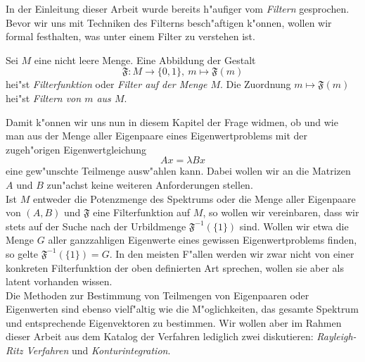 In der Einleitung dieser Arbeit wurde bereits h"aufiger vom \emph{Filtern} gesprochen.
Bevor wir uns mit Techniken des Filterns besch"aftigen k"onnen, wollen wir formal festhalten, was unter einem Filter zu verstehen ist.

\begin{defn}[Filter]\label{defn:chap3:filter}
Sei $M$ eine nicht leere Menge. Eine Abbildung der Gestalt
\[
\mathfrak{F}\colon M \to \{0,1\},\ %
m\mapsto\mathfrak{F}(m)
\]
hei"st \emph{Filterfunktion} oder \emph{Filter auf der Menge $M$}. Die Zuordnung $m\mapsto\mathfrak{F}(m)$ hei"st \emph{Filtern von $m$ aus $M$}.
\end{defn}

Damit k"onnen wir uns nun in diesem Kapitel der Frage widmen, ob und wie man aus der Menge aller Eigenpaare eines Eigenwertproblems mit der zugeh"origen Eigenwertgleichung
\[
Ax = \lambda Bx
\]
eine gew"unschte Teilmenge ausw"ahlen kann.
Dabei wollen wir an die Matrizen $A$ und $B$ zun"achst keine weiteren Anforderungen stellen.\\

Ist $M$ entweder die Potenzmenge des Spektrums oder die Menge aller Eigenpaare von $(A,B)$ und $\mathfrak{F}$ eine Filterfunktion auf $M$, so wollen wir vereinbaren, dass wir stets auf der Suche nach der Urbildmenge $\mathfrak{F}^{-1}(\{ 1\})$ sind.
Wollen wir etwa die Menge $G$ aller ganzzahligen Eigenwerte eines gewissen Eigenwertproblems finden, so gelte $\mathfrak{F}^{-1}(\{1\}) = G$. In den meisten F"allen werden wir zwar nicht von einer konkreten Filterfunktion der oben definierten Art sprechen, wollen sie aber als latent vorhanden wissen.\\

Die Methoden zur Bestimmung von Teilmengen von Eigenpaaren oder Eigenwerten sind ebenso vielf"altig wie die M"oglichkeiten, das gesamte Spektrum und entsprechende Eigenvektoren zu bestimmen.
Wir wollen aber im Rahmen dieser Arbeit aus dem Katalog der Verfahren lediglich zwei diskutieren: \emph{Rayleigh-Ritz Verfahren} und \emph{Konturintegration}.

\newpage

